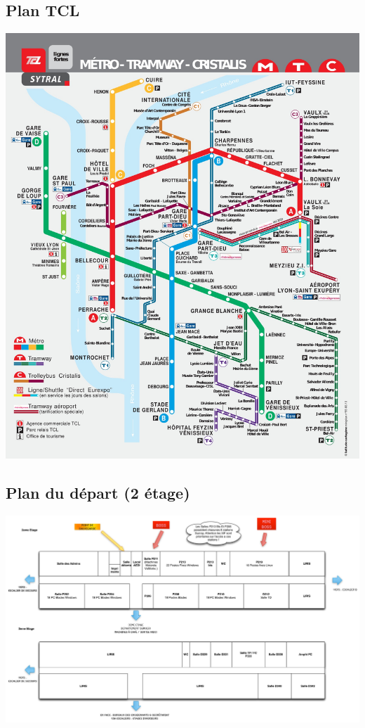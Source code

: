 \subsection{Plan TCL}
\hspace{-2cm}
\includegraphics[width=19cm]{images/planTCLFullRes.jpg}

\newpage 
\subsection{Plan du départ (2 étage)}
\begin{center}
\includegraphics[width=24cm, angle=90]{images/planDepart.jpg}
\end{center}

